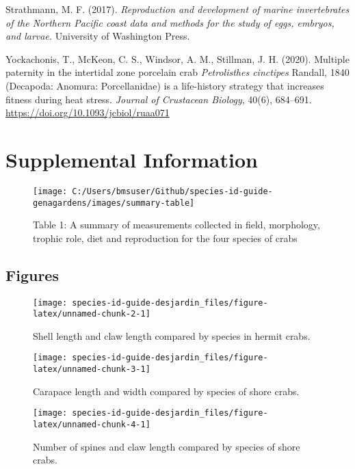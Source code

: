 \documentclass[
]{article}
\begin{document}
Strathmann, M. F. (2017). \emph{Reproduction and development of marine
invertebrates of the Northern Pacific coast data and methods for the
study of eggs, embryos, and larvae.} University of Washington Press.

Yockachonis, T., McKeon, C. S., Windsor, A. M., Stillman, J. H. (2020).
Multiple paternity in the intertidal zone porcelain crab
\emph{Petrolisthes cinctipes} Randall, 1840 (Decapoda: Anomura:
Porcellanidae) is a life-history strategy that increases fitness during
heat stress. \emph{Journal of Crustacean Biology}, 40(6), 684--691.
\url{https://doi.org/10.1093/jcbiol/ruaa071}

\newpage

\hypertarget{supplemental-information}{%
\section{Supplemental Information}\label{supplemental-information}}

\begin{figure}

\texttt{[image: C:/Users/bmsuser/Github/species-id-guide-genagardens/images/summary-table]} \hfill{}

\caption{Table 1: A summary of measurements collected in field, morphology, trophic role, diet and reproduction for the four species of crabs}\label{fig:summary-table}
\end{figure}

\hypertarget{figures-3}{%
\subsection{Figures}\label{figures-3}}

\begin{figure}
\texttt{[image: species-id-guide-desjardin\_files/figure-latex/unnamed-chunk-2-1]} \caption{Shell length and claw length compared by species in hermit crabs.}\label{fig:unnamed-chunk-2}
\end{figure}

\begin{figure}
\texttt{[image: species-id-guide-desjardin\_files/figure-latex/unnamed-chunk-3-1]} \caption{Carapace length and width compared by species of shore crabs.}\label{fig:unnamed-chunk-3}
\end{figure}

\begin{figure}
\texttt{[image: species-id-guide-desjardin\_files/figure-latex/unnamed-chunk-4-1]} \caption{Number of spines and claw length compared by species of shore crabs.}\label{fig:unnamed-chunk-4}
\end{figure}
\end{document}
